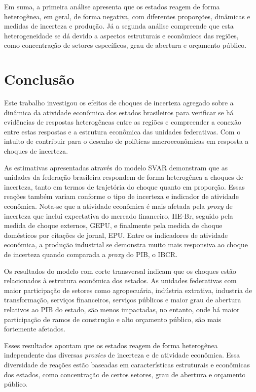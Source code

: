 Em suma, a primeira análise apresenta que os estados reagem de forma heterogênea, em geral, de forma negativa, com diferentes proporções, dinâmicas e medidas de incerteza e produção. Já a segunda análise compreende que esta heterogeneidade se dá devido a aspectos estruturais e econômicos das regiões, como concentração de setores específicos, grau de abertura e orçamento público.

\newpage
\section{Conclusão}
Este trabalho investigou os efeitos de choques de incerteza agregado sobre a dinâmica da atividade econômica dos estados brasileiros para verificar se há evidências de respostas heterogêneas entre as regiões e compreender a conexão entre estas respostas e a estrutura econômica das unidades federativas. Com o intuito de contribuir para o desenho de políticas macroeconômicas em resposta a choques de incerteza.
\par

As estimativas apresentadas através do modelo \gls{SVAR} demonstram que as unidades da federação brasileira respondem de forma heterogênea a choques de incerteza, tanto em termos de trajetória do choque quanto em proporção. Essas reações também variam conforme o tipo de incerteza e indicador de atividade econômica. Nota-se que a atividade econômica é mais afetada pela \textit{proxy} de incerteza que inclui expectativa do mercado financeiro, \gls{IIE-Br}, seguido pela medida de choque externos, \gls{GEPU}, e finalmente pela medida de choque domésticos por citações de jornal, \gls{EPU}. Entre os indicadores de atividade econômica, a produção industrial se demonstra muito mais responsiva ao choque de incerteza quando comparada a \textit{proxy} do \gls{PIB}, o \gls{IBCR}.
\par

Os resultados do modelo com corte transversal indicam que os choques estão relacionados à estrutura econômica dos estados. As unidades federativas com maior participação de setores como agropecuária, indústria extrativa, industria de transformação, serviços financeiros, serviços públicos e maior grau de abertura relativos ao \gls{PIB} do estado, são menos impactadas, no entanto, onde há maior participação de ramos de construção e alto orçamento público, são mais fortemente afetados.
\par

Esses resultados apontam que os estados reagem de forma heterogênea independente das diversas \textit{proxies} de incerteza e de atividade econômica. Essa diversidade de reações estão baseadas em características estruturais e econômicas dos estados, como concentração de certos setores, grau de abertura e orçamento público.